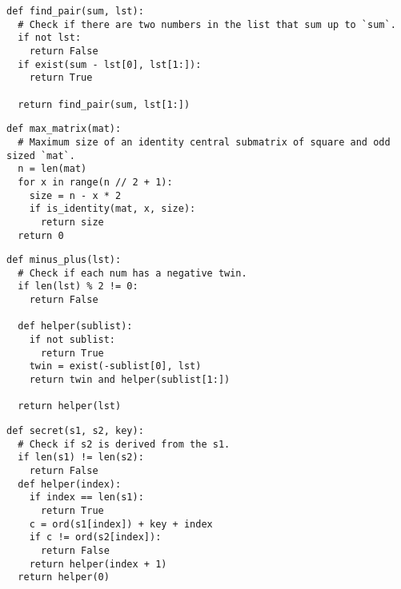 \documentclass[11pt]{article}
\begin{document}
  
\begin{multicols}{2}
\begin{lstlisting}
def find_pair(sum, lst):
  # Check if there are two numbers in the list that sum up to `sum`.
  if not lst:
    return False
  if exist(sum - lst[0], lst[1:]):
    return True

  return find_pair(sum, lst[1:])
\end{lstlisting}
\begin{lstlisting}
def max_matrix(mat):
  # Maximum size of an identity central submatrix of square and odd sized `mat`.
  n = len(mat)
  for x in range(n // 2 + 1):
    size = n - x * 2
    if is_identity(mat, x, size):
      return size
  return 0
\end{lstlisting}
\end{multicols}

\vspace{-0.85cm}

\begin{multicols}{2}
\begin{lstlisting}
def minus_plus(lst):
  # Check if each num has a negative twin.
  if len(lst) % 2 != 0:
    return False

  def helper(sublist):
    if not sublist:
      return True
    twin = exist(-sublist[0], lst)
    return twin and helper(sublist[1:])

  return helper(lst)
\end{lstlisting}
\begin{lstlisting}
def secret(s1, s2, key):
  # Check if s2 is derived from the s1.
  if len(s1) != len(s2):
    return False
  def helper(index):
    if index == len(s1):
      return True
    c = ord(s1[index]) + key + index
    if c != ord(s2[index]):
      return False
    return helper(index + 1)
  return helper(0)
\end{lstlisting}
\end{multicols}

\vspace{-0.85cm}
\end{document}
